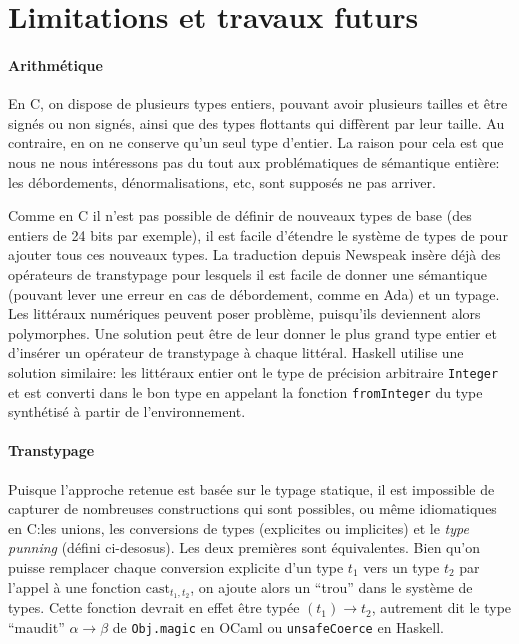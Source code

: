 \section{Limitations et travaux futurs}

\paragraph{Arithmétique}

En C, on dispose de plusieurs types entiers, pouvant avoir plusieurs tailles et
être signés ou non signés, ainsi que des types flottants qui diffèrent par leur
taille. Au contraire, en \langname{} on ne conserve qu'un seul type d'entier. La
raison pour cela est que nous ne nous intéressons pas du tout aux problématiques
de sémantique entière: les débordements, dénormalisations, etc, sont supposés ne
pas arriver.

Comme en C il n'est pas possible de définir de nouveaux types de base (des
entiers de 24 bits par exemple), il est facile d'étendre le système de types de
\langname{} pour ajouter tous ces nouveaux types. La traduction depuis Newspeak
insère déjà des opérateurs de transtypage pour lesquels il est facile de donner
une sémantique (pouvant lever une erreur en cas de débordement, comme en Ada) et
un typage. Les littéraux numériques peuvent poser problème, puisqu'ils
deviennent alors polymorphes. Une solution peut être de leur donner le plus
grand type entier et d'insérer un opérateur de transtypage à chaque littéral.
Haskell utilise une solution similaire: les littéraux entier ont le type de
précision arbitraire \texttt{Integer} et est converti dans le bon type en
appelant la fonction \texttt{fromInteger} du type synthétisé à partir de
l'environnement.

\paragraph{Transtypage}

Puisque l'approche retenue est basée sur le typage statique, il est impossible
de capturer de nombreuses constructions qui sont possibles, ou même idiomatiques
en C:\@ les unions, les conversions de types (explicites ou implicites) et le
\emph{type punning} (défini ci-desosus). Les deux premières sont équivalentes.
Bien qu'on puisse remplacer chaque conversion explicite d'un type $t_1$ vers un
type $t_2$ par l'appel à une fonction $\mathrm{cast}_{t_1,t_2}$, on ajoute alors
un ``trou'' dans le système de types. Cette fonction devrait en effet être typée
$(t_1) → t_2$, autrement dit le type ``maudit'' $α → β$ de \texttt{Obj.magic} en
OCaml ou \texttt{unsafeCoerce} en Haskell.


